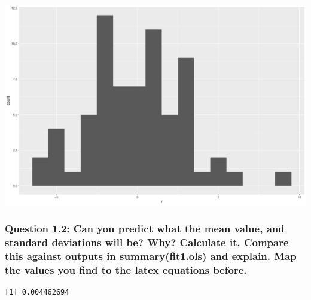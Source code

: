 \documentclass[
  letterpaper,
  DIV=11,
  numbers=noendperiod]{scrartcl}
\newenvironment{Shaded}{\begin{snugshade}}{\end{snugshade}}
\newcommand{\CommentTok}[1]{\textcolor[rgb]{0.37,0.37,0.37}{#1}}
\newcommand{\DecValTok}[1]{\textcolor[rgb]{0.68,0.00,0.00}{#1}}
\newcommand{\FunctionTok}[1]{\textcolor[rgb]{0.28,0.35,0.67}{#1}}
\newcommand{\NormalTok}[1]{\textcolor[rgb]{0.00,0.23,0.31}{#1}}
\newcommand{\OtherTok}[1]{\textcolor[rgb]{0.00,0.23,0.31}{#1}}
\newcommand{\SpecialCharTok}[1]{\textcolor[rgb]{0.37,0.37,0.37}{#1}}
\begin{document}
\includegraphics{Bayes_Lab_1_files/figure-pdf/unnamed-chunk-18-1.pdf}

\subsubsection{Question 1.2: Can you predict what the mean value, and
standard deviations will be? Why? Calculate it. Compare this against
outputs in summary(fit1.ols) and explain. Map the values you find to the
latex equations
before.}\label{question-1.2-can-you-predict-what-the-mean-value-and-standard-deviations-will-be-why-calculate-it.-compare-this-against-outputs-in-summaryfit1.ols-and-explain.-map-the-values-you-find-to-the-latex-equations-before.}

\begin{Shaded}
\end{Shaded}

\begin{verbatim}
[1] 0.004462694
\end{verbatim}

\begin{Shaded}
\end{Shaded}
\end{document}
